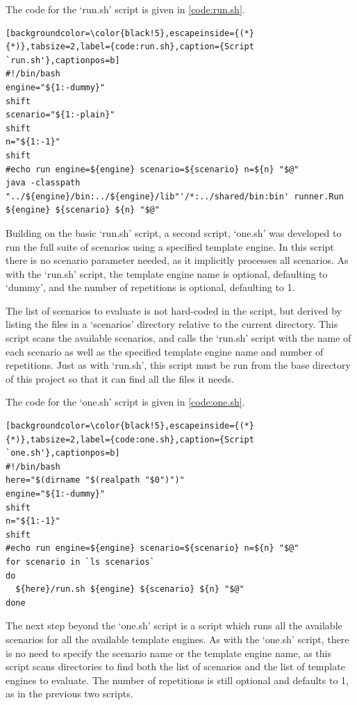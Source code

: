 The code for the `run.sh' script is given in \autoref{code:run.sh}.

\begin{lstlisting}[backgroundcolor=\color{black!5},escapeinside={(*}{*)},tabsize=2,label={code:run.sh},caption={Script `run.sh'},captionpos=b]
#!/bin/bash
engine="${1:-dummy}"
shift
scenario="${1:-plain}"
shift
n="${1:-1}"
shift
#echo run engine=${engine} scenario=${scenario} n=${n} "$@"
java -classpath "../${engine}/bin:../${engine}/lib"'/*:../shared/bin:bin' runner.Run ${engine} ${scenario} ${n} "$@"
\end{lstlisting}

Building on the basic `run.sh' script, a second script, `one.sh' was developed to run the full suite of scenarios using a specified template engine. In this script there is no scenario parameter needed, as it implicitly processes all scenarios. As with the `run.sh' script, the template engine name is optional, defaulting to `dummy', and the number of repetitions is optional, defaulting to 1. 

The list of scenarios to evaluate is not hard-coded in the script, but derived by listing the files in a `scenarios' directory relative to the current directory. This script scans the available scenarios, and calls the `run.sh' script with the name of each scenario as well as the specified template engine name and number of repetitions. Just as with `run.sh', this script must be run from the base directory of this project so that it can find all the files it needs.

The code for the `one.sh' script is given in \autoref{code:one.sh}.

\begin{lstlisting}[backgroundcolor=\color{black!5},escapeinside={(*}{*)},tabsize=2,label={code:one.sh},caption={Script `one.sh'},captionpos=b]
#!/bin/bash
here="$(dirname "$(realpath "$0")")"
engine="${1:-dummy}"
shift
n="${1:-1}"
shift
#echo run engine=${engine} scenario=${scenario} n=${n} "$@"
for scenario in `ls scenarios`
do
  ${here}/run.sh ${engine} ${scenario} ${n} "$@"
done
\end{lstlisting}

The next step beyond the `one.sh' script is a script which runs all the available scenarios for all the available template engines. As with the `one.sh' script, there is no need to specify the scenario name or the template engine name, as this script scans directories to find both the list of scenarios and the list of template engines to evaluate. The number of repetitions is still optional and defaults to 1, as in the previous two scripts.


